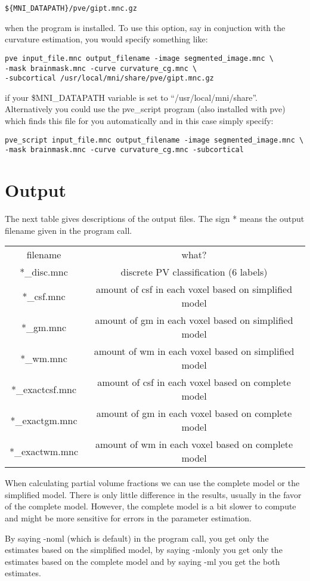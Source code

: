 \documentclass{article}
\begin{document}
\begin{verbatim}
${MNI_DATAPATH}/pve/gipt.mnc.gz
\end{verbatim}

when the program is installed.  To use this option, say in conjuction with the curvature
estimation, you would specify something like:

\begin{verbatim}
pve input_file.mnc output_filename -image segmented_image.mnc \
-mask brainmask.mnc -curve curvature_cg.mnc \
-subcortical /usr/local/mni/share/pve/gipt.mnc.gz
\end{verbatim}

if your \$MNI\_DATAPATH variable is set to ``/usr/local/mni/share''.  Alternatively
you could use the pve\_script program (also installed with pve) which finds this file for you 
automatically and in this case simply specify:

\begin{verbatim}
pve_script input_file.mnc output_filename -image segmented_image.mnc \  
-mask brainmask.mnc -curve curvature_cg.mnc -subcortical
\end{verbatim}

\section{Output}

The next table gives descriptions of the output files. The sign *
means the output filename given in the program call. 
\begin{center}
\begin{tabular}{c|c}
filename & what? \\
*\_disc.mnc     & discrete PV classification (6 labels) \\
*\_csf.mnc      & amount of csf in each voxel based on simplified model \\
*\_gm.mnc       & amount of gm in each voxel  based on simplified model \\
*\_wm.mnc       & amount of wm in each voxel  based on simplified model \\
*\_exactcsf.mnc & amount of csf in each voxel based on complete model \\
*\_exactgm.mnc  &  amount of gm in each voxel based on complete model \\
*\_exactwm.mnc  &  amount of wm in each voxel based on complete model \\
\end{tabular}
\end{center}

When calculating partial
volume fractions we can use the complete model or the simplified
model. There is only little difference in the results, usually in the
favor of the complete model. However, the complete model is a bit 
slower to compute and might be more sensitive for errors in the parameter estimation. 

By saying -noml (which is default) in the program call, you get 
only the estimates based on the simplified model, by saying -mlonly  you get 
only the estimates based on the complete model and by saying -ml you
get the both estimates.
\end{document}
